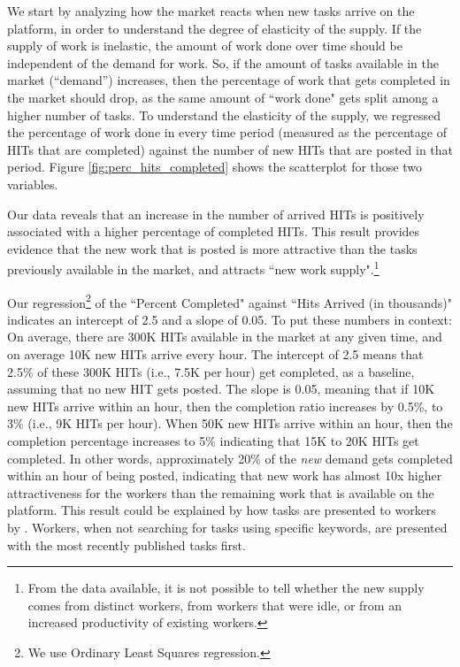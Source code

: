 We start by analyzing how the market reacts when new tasks arrive on the
platform, in order to understand the degree of elasticity of the supply. If the supply of work is inelastic, the amount of work done over time should
be independent of the demand for work. So, if the amount of tasks
available in the market (``demand'') increases, then the percentage of
work that gets completed in the market should drop, as the same amount of ``work done" gets split among a higher number of tasks. To
understand the elasticity of the supply, we regressed the percentage of
work done in every time period (measured as the percentage of HITs
that are completed) against the number of new HITs that are posted in
that period. Figure \ref{fig:perc_hits_completed} shows the scatterplot for those two variables.

Our data reveals that an increase in the number of arrived HITs is
positively associated with a higher percentage of completed HITs. This
result provides evidence that the new work that is posted is more
attractive than the tasks previously available in the market, and attracts ``new
work supply".\footnote{From the data available, it is not possible to tell
whether the new supply comes from distinct
workers, from workers that were idle, or from an increased productivity
of existing workers.}

Our regression\footnote{We use Ordinary Least Squares regression.} of the ``Percent Completed" against ``Hits Arrived (in
thousands)" indicates an intercept of 2.5 and a slope of 0.05. To put
these numbers in context: On average, there are 300K
HITs available in the market at any given time, and on average 10K new HITs arrive
every hour. The intercept of 2.5 means that 2.5\% of these 300K HITs
(i.e., 7.5K per hour) get completed, as a baseline, assuming that no
new HIT gets posted. The slope is 0.05, meaning that if 10K new HITs
arrive within an hour, then the completion ratio increases by
0.5\%, to 3\% (i.e., 9K HITs per hour). When 50K new HITs arrive within
an hour, then the completion percentage increases to 5\% indicating
that 15K to 20K HITs get completed. In other words, approximately 20\%
of the \emph{new} demand gets completed within an hour of being posted,
indicating that new work has almost 10x higher attractiveness for the
workers than the remaining work that is available on the platform.
% 
This result could be explained by how tasks are presented to workers by \amt{}.
Workers, when not searching for tasks using specific keywords, are presented with the most recently published tasks first.

